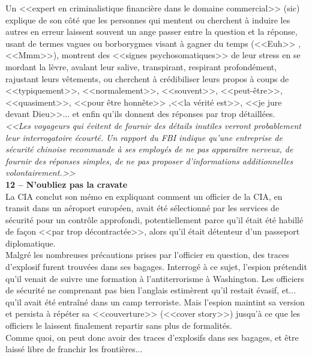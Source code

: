 \documentclass[11pt,twoside,a4paper]{article}
\begin{document}
Un <<expert en criminalistique financi{\`e}re dans le domaine commercial>> (sic) explique de son c{\^o}t{\'e} que les personnes qui mentent ou cherchent {\`a} induire les autres en erreur laissent souvent un ange passer entre la question et la r{\'e}ponse, usant de termes vagues ou borborygmes visant {\`a} gagner du temps (<<Euh>> ,<<Mmm>>), montrent des <<signes psychosomatiques>> de leur stress en se mordant la l{\`e}vre, avalant leur salive, transpirant, respirant profond{\'e}ment, rajustant leurs v{\^e}tements, ou cherchent {\`a} cr{\'e}dibiliser leurs propos {\`a} coups de <<typiquement>>, <<normalement>>, <<souvent>>, <<peut-{\^e}tre>>, <<quasiment>>, <<pour {\^e}tre honn{\^e}te>> ,<<la v{\'e}rit{\'e} est>>, <<je jure devant Dieu>>... et enfin qu'ils donnent des r{\'e}ponses par trop d{\'e}taill{\'e}es. ~\\

    \emph{<<Les voyageurs qui {\'e}vitent de fournir des d{\'e}tails inutiles verront probablement leur interrogatoire {\'e}court{\'e}. Un rapport du FBI indique qu'une entreprise de s{\'e}curit{\'e} chinoise recommande {\`a} ses employ{\'e}s de ne pas appara{\^i}tre nerveux, de fournir des r{\'e}ponses simples, de ne pas proposer d'informations additionnelles volontairement.>>}~\\

\textbf{\large 12 -- N'oubliez pas la cravate}~\\

La CIA conclut son m{\'e}mo en expliquant comment un officier de la CIA, en transit dans un a{\'e}roport europ{\'e}en, avait {\'e}t{\'e} s{\'e}lectionn{\'e} par les services de s{\'e}curit{\'e} pour un contr{\^o}le approfondi, potentiellement parce qu'il {\'e}tait {\'e}t{\'e} habill{\'e} de fa\c{c}on <<par trop d{\'e}contract{\'e}e>>, alors qu'il {\'e}tait d{\'e}tenteur d'un passeport diplomatique. ~\\

Malgr{\'e} les nombreuses pr{\'e}cautions prises par l'officier en question, des traces d'explosif furent trouv{\'e}es dans ses bagages. Interrog{\'e} {\`a} ce sujet, l'espion pr{\'e}tendit qu'il venait de suivre une formation {\`a} l'antiterrorisme {\`a} Washington. Les officiers de s{\'e}curit{\'e} ne comprenant pas bien l'anglais estim{\`e}rent qu'il restait {\'e}vasif, et... qu'il avait {\'e}t{\'e} entra{\^i}n{\'e} dans un camp terroriste. Mais l'espion maintint sa version et persista {\`a} r{\'e}p{\'e}ter sa <<couverture>> (<<cover story>>) jusqu'{\`a} ce que les officiers le laissent finalement repartir sans plus de formalit{\'e}s. ~\\

Comme quoi, on peut donc avoir des traces d'explosifs dans ses bagages, et {\^e}tre laiss{\'e} libre de franchir les fronti{\`e}res... ~\\
\end{document}
